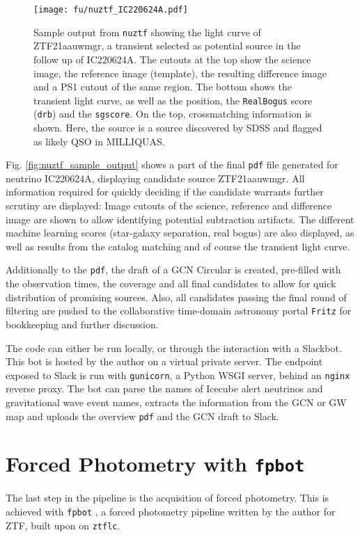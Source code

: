 \begin{figure}[h!]
    \texttt{[image: fu/nuztf\_IC220624A.pdf]}
    \caption[\texttt{nuztf} output]{Sample output from \texttt{nuztf} showing the light curve of ZTF21aauwmgr, a transient selected as potential source in the follow up of IC220624A. The cutouts at the top show the science image, the reference image (template), the resulting difference image and a PS1 cutout of the same region. The bottom shows the transient light curve, as well as the position, the \texttt{RealBogus} score (\texttt{drb}) and the \texttt{sgscore}. On the top, crossmatching information is shown. Here, the source is a source discovered by SDSS and flagged as likely QSO in MILLIQUAS.}
\end{figure}
Fig. \ref{fig:nuztf_sample_output} shows a part of the final \texttt{pdf} file generated for neutrino IC220624A, displaying candidate source ZTF21aauwmgr. All information required for quickly deciding if the candidate warrants further scrutiny are displayed: Image cutouts of the science, reference and difference image are shown to allow identifying potential subtraction artifacts. The different machine learning scores (star-galaxy separation, real bogus) are also displayed, as well as results from the catalog matching and of course the transient light curve.

Additionally to the \texttt{pdf}, the draft of a GCN Circular is created, pre-filled with the observation times, the coverage and all final candidates to allow for quick distribution of promising sources. Also, all candidates passing the final round of filtering are pushed to the collaborative time-domain astronomy portal \texttt{Fritz} for bookkeeping and further discussion.

The code can either be run locally, or through the interaction with a Slackbot. This bot is hosted by the author on a virtual private server. The endpoint exposed to Slack is run with \texttt{gunicorn}, a Python WSGI server, behind an \texttt{nginx} reverse proxy. The bot can parse the names of Icecube alert neutrinos and gravitational wave event names, extracts the information from the GCN or GW map and uploads the overview \texttt{pdf} and the GCN draft to Slack.

\section{Forced Photometry with \texttt{fpbot}} \label{fpbot}
The last step in the pipeline is the acquisition of forced photometry. This is achieved with \texttt{fpbot} , a forced photometry pipeline written by the author for ZTF, built upon on \texttt{ztflc}.


